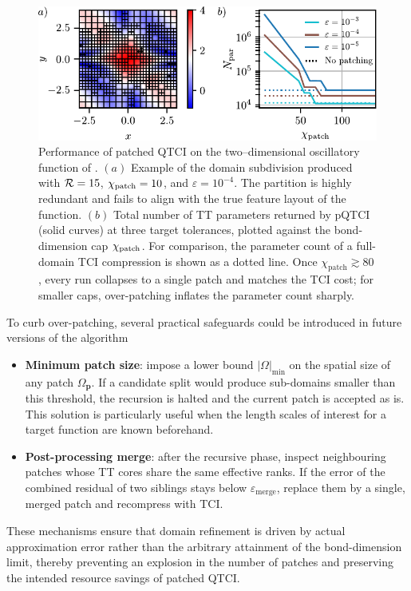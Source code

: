 \begin{figure}[htbp]
	\centering
	\includegraphics{figures/OverPatching.pdf}
	\caption{Performance of patched QTCI on the two–dimensional oscillatory function of .  $(a)$ Example of the domain subdivision produced with $\mathcal{R} = 15$, $\chi_{\text{patch}} = 10$, and $\varepsilon = 10^{-4}$.  The partition is highly redundant and fails to align with the true feature layout of the function. $(b)$ Total number of TT parameters returned by pQTCI (solid curves) at three target tolerances, plotted against the bond-dimension cap $\chi_{\text{patch}}$.  For comparison, the parameter count of a full-domain TCI compression is shown as a dotted line.  Once $\chi_{\text{patch}}\gtrsim 80$, every run collapses to a single patch and matches the TCI cost; for smaller caps, over-patching inflates the parameter count sharply.}
	\label{fig:2DOverpatching}
\end{figure}

To curb over-patching, several practical safeguards could be introduced in future versions of the algorithm
%
\begin{itemize}
  	\item \textbf{Minimum patch size}: impose a lower bound $|\Omega|_{\min}$ on the spatial size of any patch $\Omega_{\mathbf p}$. If a candidate split would produce sub-domains smaller than this threshold, the recursion is halted and the current patch is accepted as is. This solution is particularly useful when the length scales of interest for a target function are known beforehand.
  \item \textbf{Post-processing merge}: after the recursive phase, inspect neighbouring patches whose TT cores share the same effective ranks.  If the error of the combined residual of two siblings stays below $\varepsilon_{\text{merge}}$, replace them by a single, merged patch and recompress with TCI.
\end{itemize}

These mechanisms ensure that domain refinement is driven by actual approximation error rather than the arbitrary attainment of the bond-dimension limit, thereby preventing an explosion in the number of patches and preserving the intended resource savings of patched QTCI.